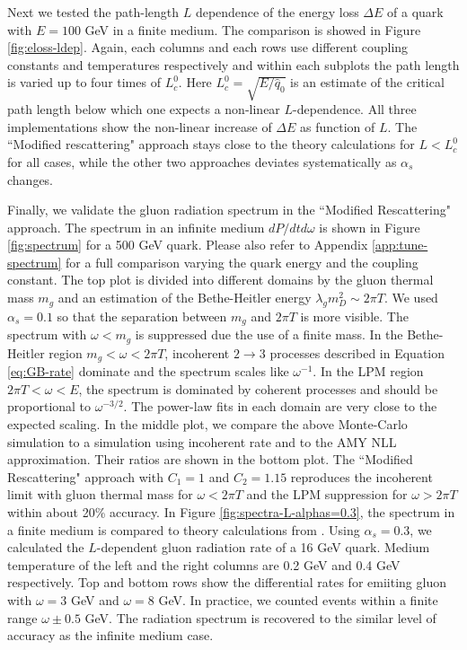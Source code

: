 \documentclass[aps, prc, reprint, amsmath, groupedaddress, nofootinbib]{revtex4-1}
\begin{document}
Next we tested the path-length $L$ dependence of the energy loss $\Delta E$ of a quark with $E = 100$ GeV in a finite medium.
The comparison is showed in Figure \ref{fig:eloss-ldep}.
Again, each columns and each rows use different coupling constants and temperatures respectively and within each subplots the path length is varied up to four times of $L_c^0$.
Here $L_c^0 = \sqrt{E/\hat{q}_0}$ is an estimate of the critical path length below which one expects a non-linear $L$-dependence.
All three implementations show the non-linear increase of $\Delta E$ as function of $L$.
The ``Modified rescattering" approach stays close to the theory calculations for $L<L_c^0$ for all cases, while the other two approaches deviates systematically as $\alpha_s$ changes.

Finally, we validate the gluon radiation spectrum in the ``Modified Rescattering" approach. 
The spectrum in an infinite medium $dP/dtd\omega$ is shown in Figure \ref{fig:spectrum} for a 500 GeV quark.
Please also refer to Appendix \ref{app:tune-spectrum} for a full comparison varying the quark energy and the coupling constant.
The top plot is divided into different domains by the gluon thermal mass $m_g$ and an estimation of the Bethe-Heitler energy $\lambda_g m_D^2 \sim 2\pi T$.
We used $\alpha_s = 0.1$ so that the separation between $m_g$ and $2\pi T$ is more visible.
The spectrum with $\omega < m_g$ is suppressed due the use of a finite mass.
In the Bethe-Heitler region $m_g < \omega < 2\pi T$, incoherent $2\rightarrow 3$ processes described in Equation \ref{eq:GB-rate} dominate and the spectrum scales like $\omega^{-1}$.
In the LPM region $2\pi T < \omega < E$, the spectrum is dominated by coherent processes and should be proportional to $\omega^{-3/2}$.
The power-law fits in each domain are very close to the expected scaling.
In the middle plot, we compare the above Monte-Carlo simulation to a simulation using incoherent rate and to the AMY NLL approximation. 
Their ratios are shown in the bottom plot.
The ``Modified Rescattering" approach with $C_1 = 1$ and $C_2 = 1.15$ reproduces the incoherent limit with gluon thermal mass for $\omega < 2\pi T$ and the LPM suppression for $\omega > 2\pi T$ within about 20\% accuracy.
In Figure \ref{fig:spectra-L-alphas=0.3}, the spectrum in a finite medium is compared to theory calculations from \cite{CaronHuot:2008uh}.
Using $\alpha_s = 0.3$, we calculated the $L$-dependent gluon radiation rate of a 16 GeV quark.
Medium temperature of the left and the right columns are 0.2 GeV and 0.4 GeV respectively.
Top and bottom rows show the differential rates for emiiting gluon with $\omega = 3$ GeV and $\omega = 8$ GeV. 
In practice, we counted events within a finite range $\omega\pm 0.5$ GeV.
The radiation spectrum is recovered to the similar level of accuracy as the infinite medium case.
\end{document}
